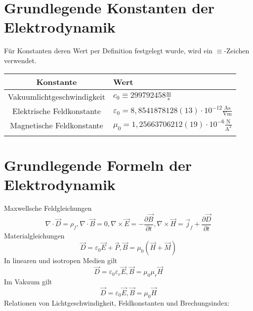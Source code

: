 \section{Grundlegende Konstanten der Elektrodynamik\label{mark-1.3}}

Für Konstanten deren Wert per Definition festgelegt wurde, wird ein $\equiv $-Zeichen verwendet.


\begin{table}[H]
    \centering
	\begin{tabular}{|c|l|} \hline
		\textbf{Konstante}         & \textbf{Wert} \\\hline
		Vakuumlichtgeschwindigkeit & \centering\arraybackslash{}$c_{0}\equiv 299792458\frac{\mathrm{m}}{\mathrm{s}}$  \\\hline
		Elektrische Feldkonstante  & $\varepsilon _{0}=8,8541878128\left(13\right)\cdot 10^{-12}\frac{\mathrm{As}}{\mathrm{Vm}}$ \\\hline
		Magnetische Feldkonstante  & $\mu _{0}=1,25663706212\left(19\right)\cdot 10^{-6}\frac{\mathrm{N}}{\mathrm{A}^{2}}$  \\\hline
		                           &         \\\hline
	\end{tabular}
\end{table}
\section{Grundlegende Formeln der Elektrodynamik\label{mark-1.4}}

Maxwellsche Feldgleichungen
\begin{equation*}
	\nabla \cdot \vec {D}=\rho _{f},\nabla \cdot \vec {B}=0,\nabla \times \vec {E}=-\frac{\partial \vec {B}}{\partial t},\nabla \times \vec {H}=\vec {j}_{f}+\frac{\partial \vec {D}}{\partial t}
\end{equation*}
Materialgleichungen
\begin{equation*}
	\vec {D}=\varepsilon _{0}\vec {E}+\vec {P}, \vec {B}=\mu _{0}\left(\vec {H}+\vec {M}\right)
\end{equation*}
In linearen und isotropen Medien gilt
\begin{equation*}
	\vec {D}=\varepsilon _{0}\varepsilon _{r}\vec {E}, \vec {B}=\mu _{0}\mu _{r}\vec {H}
\end{equation*}
Im Vakuum gilt
\begin{equation*}
	\vec {D}=\varepsilon _{0}\vec {E}, \vec {B}=\mu _{0}\vec {H}
\end{equation*}
Relationen von Lichtgeschwindigkeit, Feldkonstanten und Brechungsindex:

